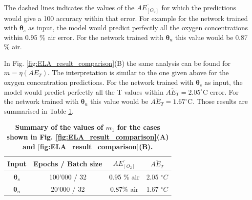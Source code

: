 \documentclass[9pt,twocolumn,twoside,pdftex]{optica}
\begin{document}
The dashed lines indicates the values of the $\overline{AE_{[O_2]}}$ for which the predictions would give a 100 accuracy within that error. For example for the network trained with ${\pmb \theta}_s$ as input, the model would predict perfectly all the oxygen concentrations within 0.95 \% air error. For the network trained with ${\pmb \theta}_n$ this value would be 0.87 \% air. 

In Fig. \ref{fig:ELA_result_comparison}(B) the same analysis can be found for $m=\eta(AE_T)$. The interpretation is similar to the one given above for the oxygen concentration predictions. For the network trained with ${\pmb \theta}_s$ as input, the model would predict perfectly all the T values within $\overline{AE_{T}}=2.05^\circ$C error. For the network trained with ${\pmb \theta}_n$ this value would be $\overline{AE_{T}}=1.67^\circ$C. Those results are summarised in Table \ref{table:ela}.

\begin{table}[t!]
\centering
\caption {\bf Summary of the values of $m_1$ for the cases shown in Fig. \ref{fig:ELA_result_comparison}(A) and \ref{fig:ELA_result_comparison}(B).}

\begin{tabular}{ cccc}
\smallskip 
 Input & Epochs / Batch size & $\overline{AE_{[O_2]}}$ & $\overline{AE_{T}}$  \\ 
 \hline
${\pmb \theta}_s$ & 100'000 / 32 & 0.95 \% air & 2.05 $^\circ C$\\ 
${\pmb \theta}_n $ & 20'000 / 32 & 0.87\% air & 1.67 $^\circ C$\\ 

\end{tabular}
\label{table:ela}
\end{table}


\end{document}
